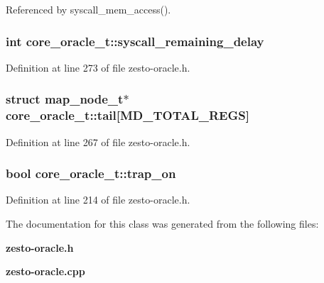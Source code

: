 Referenced by syscall\_\-mem\_\-access().
\subsubsection[{syscall\_\-remaining\_\-delay}]{\setlength{\rightskip}{0pt plus 5cm}int {\bf core\_\-oracle\_\-t::syscall\_\-remaining\_\-delay}\hspace{0.3cm}{\tt  [protected]}}\label{classcore__oracle__t_d05c62a2af37a512e534a10a028ec5d8}




Definition at line 273 of file zesto-oracle.h.
\subsubsection[{tail}]{\setlength{\rightskip}{0pt plus 5cm}struct {\bf map\_\-node\_\-t}$\ast$ {\bf core\_\-oracle\_\-t::tail}[MD\_\-TOTAL\_\-REGS]\hspace{0.3cm}{\tt  [read]}}\label{classcore__oracle__t_18f3005409a1dd35d59308bec340b1aa}




Definition at line 267 of file zesto-oracle.h.
\subsubsection[{trap\_\-on}]{\setlength{\rightskip}{0pt plus 5cm}bool {\bf core\_\-oracle\_\-t::trap\_\-on}}\label{classcore__oracle__t_ffe6e1c853fef3e925dfd93cb1f8492a}




Definition at line 214 of file zesto-oracle.h.

The documentation for this class was generated from the following files:\begin{CompactItemize}
\item 
{\bf zesto-oracle.h}\item 
{\bf zesto-oracle.cpp}\end{CompactItemize}
